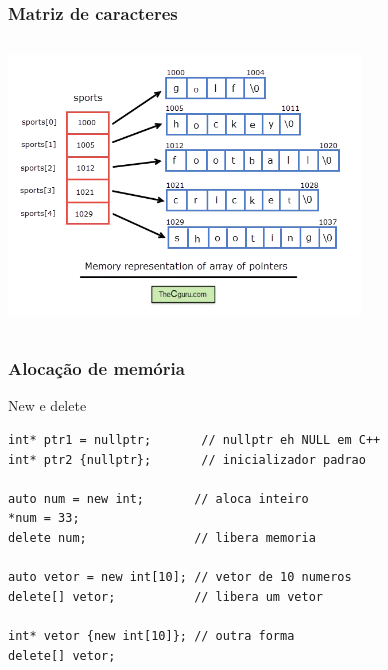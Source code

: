 \documentclass[xcolor={usenames,dvipsnames},12pt,presentation,aspectratio=169]{beamer}
\begin{document}
\begin{frame}[fragile]
  \frametitle{Matriz de caracteres}
  \begin{columns}
    \begin{column}{\textwidth}
      \begin{center}
    \includegraphics[width=0.7\textwidth]{C2Darray}
      \end{center}
    \end{column}
  \end{columns}
\end{frame}
\begin{frame}[fragile]
  \frametitle{Alocação de memória}
  \begin{block}{New e delete}
\begin{lstlisting}
int* ptr1 = nullptr;       // nullptr eh NULL em C++
int* ptr2 {nullptr};       // inicializador padrao

auto num = new int;       // aloca inteiro
*num = 33;
delete num;               // libera memoria

auto vetor = new int[10]; // vetor de 10 numeros
delete[] vetor;           // libera um vetor 

int* vetor {new int[10]}; // outra forma
delete[] vetor;
\end{lstlisting}
  \end{block}
\end{frame}
\end{document}
